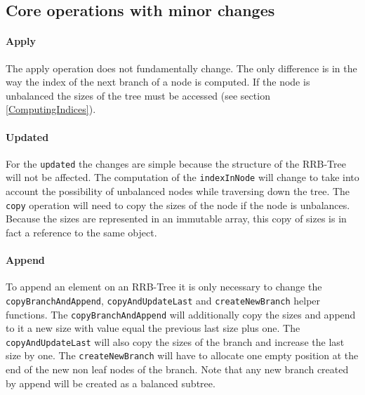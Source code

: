 \subsection{Core operations with minor changes}

\paragraph{Apply}
The apply operation does not fundamentally change. The only difference is in the way the index of the next branch of a node is computed. If the node is unbalanced the sizes of the tree must be accessed (see section \ref{ComputingIndices}).



\paragraph{Updated}
For the \texttt{updated} the changes are simple because the structure of the RRB-Tree will not be affected. The computation of the \texttt{indexInNode} will change to take into account the possibility of unbalanced nodes while traversing down the tree. The \texttt{copy} operation will need to copy the sizes of the node if the node is unbalances. Because the sizes are represented in an immutable array, this copy of sizes is in fact a reference to the same object.


\paragraph{Append}
To append an element on an RRB-Tree it is only necessary to change the \texttt{copyBranchAndAppend},  \texttt{copyAndUpdateLast} and \texttt{createNewBranch} helper functions. The \texttt{copyBranchAndAppend} will additionally copy the sizes and append to it a new size with value equal the previous last size plus one. The \texttt{copyAndUpdateLast} will also copy the sizes of the branch and increase the last size by one. The \texttt{createNewBranch} will have to allocate one empty position at the end of the new non leaf nodes of the branch. Note that any new branch created by append will be created as a balanced subtree.

